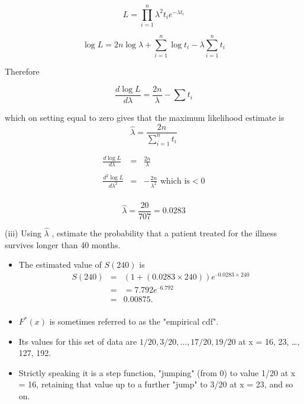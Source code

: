 \documentclass[a4paper,12pt]{article}
\begin{document}
\begin{itemize}
\[ L = \prod^{n}_{i=1} \lambda^2t_{i} e^{-\lambda t_i}\]

\[ \log L = 2n \log \lambda + \sum^{n}_{i=1} \log t_i - \lambda \sum^{n}_{i=1} t_i \]

Therefore

\[ \frac{d \log L}{ d \lambda} =  \frac{2n}{\lambda} -  \sum t_{i} \]

which on setting equal to zero gives that the maximum
likelihood estimate is
\[ \hat{\lambda} = \frac{2n}{\sum^{n}_{i=1} t_i }  \]

\begin{eqnarray*} 
\frac{d \log L}{ d \lambda} &=&  \frac{2n}{\lambda} \\
& & \\
\frac{d^2 \log L}{ d \lambda^2} &=&  -\frac{2n}{\lambda^2}  \mbox{ which is} <0 \\
\end{eqnarray*}

\[ \hat{\lambda}  = \frac{20}{707} = 0.0283 \]

\end{itemize}


\newpage



\begin{framed}
(iii) Using $\hat{\lambda}$  , estimate the probability that a patient treated for the illness survives
longer than 40 months.
\end{framed}




\begin{itemize}
\item The estimated value of $S(240)$ is 
\begin{eqnarray*}
S(240)  &=& (1 + (0.0283 \times 240))e^{–0.0283 \times  240} \\
&=& = 7.792e^{–6.792}\\
&=& 0.00875.\\
\end{eqnarray*}
\item $F^{\ast}(x)$ is sometimes referred to as the "empirical cdf". 
\item Its values for this set of data are $1/20, 3/20, \ldots, 17/20, 19/20$ at x = 16, 23, …, 127, 192. 
\item Strictly speaking it is a step function, "jumping" (from 0) to value 1/20 at x = 16, retaining that value up to a further "jump" to 3/20 at x = 23, and so on. 
\end{itemize}
\newpage
\end{document}
